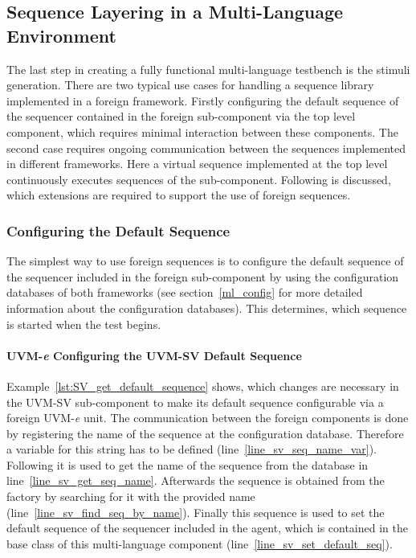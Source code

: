 \subsection{Sequence Layering in a Multi-Language Environment}
The last step in creating a fully functional multi-language testbench is the stimuli generation. There are two typical
use cases for handling a sequence library implemented in a foreign framework. Firstly configuring the default sequence
of the sequencer contained in the foreign sub-component via the top level component, which requires minimal interaction between
these components. The second case requires ongoing communication between the sequences implemented in different
frameworks. Here a virtual sequence implemented at the top level continuously executes sequences of the sub-component.
Following is discussed, which extensions are required to support the use of foreign sequences.

\subsubsection{Configuring the Default Sequence}
The simplest way to use foreign sequences is to configure the default sequence of the sequencer included in the foreign
sub-component by using the configuration databases of both frameworks (see section~\ref{ml_config} for more detailed
information about the configuration databases). This determines, which sequence is started when the test begins.

\paragraph{UVM-\textit{e} Configuring the UVM-SV Default Sequence}
Example~\ref{lst:SV_get_default_sequence} shows, which changes are necessary in the UVM-SV sub-component to make its default sequence configurable via a foreign UVM-\textit{e} unit. The communication between the foreign components is done by registering the name of the sequence at the configuration database. Therefore a variable for this string has to be defined (line~\ref{line_sv_seq_name_var}). Following it is used to get the name of the sequence from the database in line~\ref{line_sv_get_seq_name}. Afterwards the sequence is obtained from the factory by searching for it with the provided name (line~\ref{line_sv_find_seq_by_name}). Finally this sequence is used to set the default sequence of the sequencer included in the agent, which is contained in the base class of this multi-language component (line~\ref{line_sv_set_default_seq}).   

